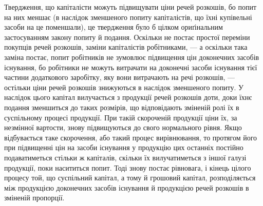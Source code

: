 Твердження, що капіталісти можуть підвищувати ціни речей розкошів,
бо попит на них меншає (в наслідок зменшеного попиту капіталістів, що
їхні купівельні засоби на це поменшали), це твердження було б цілком
ориґінальним застосуванням закону попиту й подання. Оскільки не постає
простої переміни покупців речей розкошів, заміни капіталістів робітниками, —
а оскільки така заміна постає, попит робітників не зумовлює підвищення
цін доконечних засобів існування, бо робітники не можуть витрачати на
доконечні засоби існування тієї частини додаткового заробітку, яку вони
витрачають на речі розкошів, — остільки ціни речей розкошів знижуються
в наслідок зменшеного попиту. У наслідок цього капітал вилучається з
продукції речей розкошів доти, доки їхнє подання зменшиться до таких
розмірів, що відповідають зміненій ролі їх в суспільному процесі продукції.
При такій скороченій продукції ціни їх, за незмінної вартости, знову
підвищуються до свого нормального рівня. Якщо відбувається таке
скорочення, або такий процес вирівнювання, то протягом його при підвищенні
цін на засоби існування у продукцію цих останніх постійно
подаватиметься стільки ж капіталів, скільки їх вилучатиметься з іншої
галузі продукції, поки насититься попит. Тоді знову постає рівновага, і
кінець цілого процесу той, що суспільний капітал, а тому й грошовий
капітал, розподіляється між продукцією доконечних засобів існування й
продукцією речей розкошів в зміненій пропорції.

